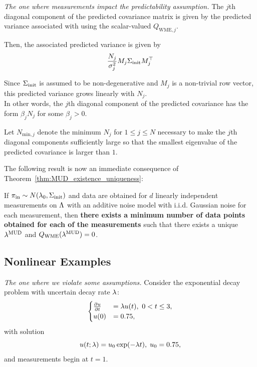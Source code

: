 \begin{frame}[t]{\it The one where measurements impact the predictability assumption.}
\centering
The $j$th diagonal component of the predicted covariance matrix is given by the predicted variance associated with using the scalar-valued $Q_{\text{WME},j}$.

Then, the associated predicted variance is given by
\begin{equation}
	\frac{N_j}{\sigma_j^2} M_j\Sigma_\text{init} M_j^\top
\end{equation}

Since $\Sigma_\text{init}$ is assumed to be non-degenerative and $M_j$ is a non-trivial row vector, this predicted variance grows linearly with $N_j$.\\
\vskip 12pt
In other words, the $j$th diagonal component of the predicted covariance has the form $\beta_j N_j$ for some $\beta_j>0$.
\end{frame}


\begin{frame}[t]
\centering
Let $N_{\text{min},j}$ denote the minimum $N_j$ for $1\leq j\leq N$ necessary to make the $j$th diagonal components sufficiently large so that the smallest eigenvalue of the predicted covariance is larger than $1$.

\vskip 12pt
The following result is now an immediate consequence of Theorem~\ref{thm:MUD_existence_uniqueness}:\\

\begin{corollary}\label{cor:MUD_wme}
If $\operatorname*{\pi_{in}} \sim N(\lambda_0,\Sigma_\text{init})$ and data are obtained for $d$ linearly independent measurements on ${\Lambda}$ with an additive noise model with i.i.d. Gaussian noise for each measurement, then {\bf there exists a minimum number of data points obtained for each of the measurements} such that there exists a unique $\lambda^{\text{MUD}}$ and $Q_\text{WME}(\lambda^{\text{MUD}}) = 0$.
\end{corollary}


\end{frame}

\subsection{Nonlinear Examples}


\begin{frame}[t]{\it The one where we violate some assumptions.}
\centering
Consider the exponential decay problem with uncertain decay rate $\lambda$:
$$
\begin{cases}
\frac{\partial u}{\partial t} & = \lambda u(t), \ 0<t\leq 3, \\ u(0) &= 0.75,
\end{cases}
$$
with solution
\begin{equation}
u(t;\lambda) = u_0\exp(-\lambda t), \; u_0 = 0.75 ,
\end{equation}
and measurements begin at $t=1$.
\end{frame}


